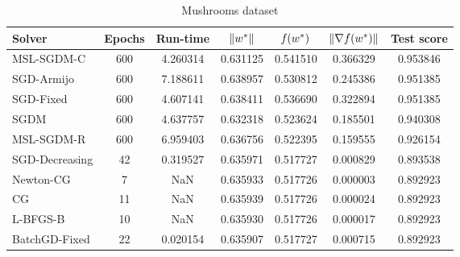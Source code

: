 \begin{table}
\caption{Mushrooms dataset}
\label{tab:mush-tab}
\centering
\begin{tabular}{lS[drop-zero-decimal]S[round-precision=4]S[round-precision=6]S[round-precision=6]S[exponent-mode=scientific]S[round-precision=6]}
\toprule
Solver & {Epochs} & {Run-time} & {$\lVert w^\ast\rVert$} & {$\operatorname*{\mathit{f}}(w^\ast)$} & {$\lVert\nabla f(w^\ast)\rVert$} & {Test score} \\
\midrule
MSL-SGDM-C & 600 & 4.260314 & 0.631125 & 0.541510 & 0.366329 & 0.953846 \\
SGD-Armijo & 600 & 7.188611 & 0.638957 & 0.530812 & 0.245386 & 0.951385 \\
SGD-Fixed & 600 & 4.607141 & 0.638411 & 0.536690 & 0.322894 & 0.951385 \\
SGDM & 600 & 4.637757 & 0.632318 & 0.523624 & 0.185501 & 0.940308 \\
MSL-SGDM-R & 600 & 6.959403 & 0.636756 & 0.522395 & 0.159555 & 0.926154 \\
SGD-Decreasing & 42 & 0.319527 & 0.635971 & 0.517727 & 0.000829 & 0.893538 \\
Newton-CG & 7 & NaN & 0.635933 & 0.517726 & 0.000003 & 0.892923 \\
CG & 11 & NaN & 0.635939 & 0.517726 & 0.000024 & 0.892923 \\
L-BFGS-B & 10 & NaN & 0.635930 & 0.517726 & 0.000017 & 0.892923 \\
BatchGD-Fixed & 22 & 0.020154 & 0.635907 & 0.517727 & 0.000715 & 0.892923 \\
\bottomrule
\end{tabular}
\end{table}

